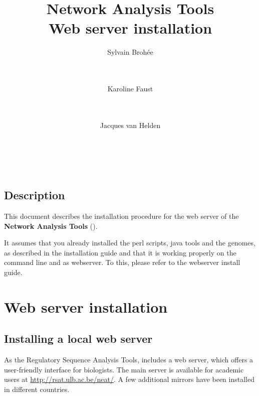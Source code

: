 \documentclass{book}
\begin{document}
\title{Network Analysis Tools \\
Web server installation}

\author{
	Sylvain Broh\'ee \\
	 \\
        \and \\
	Karoline Faust \\
	 \\
        \and \\
	Jacques van Helden \\
	\\
        \\
        \\
        \bigre
}


\maketitle

\newpage
\tableofcontents
\newpage

\section*{Description}

This document describes the installation procedure for the web server
of the \textbf{Network Analysis Tools} (\neat).

It assumes that you already installed the perl scripts, java tools and the
genomes, as described in the \RSAT installation guide and that it is
working properly on the command line and as webserver. To this, please refer to the \RSAT webserver install guide.

\chapter{Web server installation}
\section{Installing a local web server}

As the Regulatory Sequence Analysis Tools, \neat includes a web server, which
offers a user-friendly interface for biologists. The main server is
available for academic users at \url{http://rsat.ulb.ac.be/neat/}. A
few additional mirrors have been installed in different countries.
\end{document}
